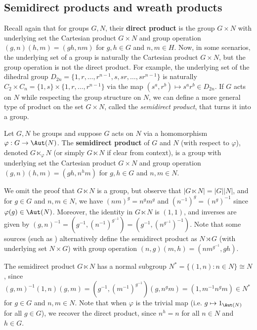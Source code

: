 \subsection{Semidirect products and wreath products}

Recall again that for groups $G,N$, their \textbf{direct product} is the group $G \times N$ with underlying set the Cartesian product $G \times N$ and group operation $(g,n)(h,m) = (gh,nm)$ for $g,h \in G$ and $n,m \in H$. Now, in some scenarios, the underlying set of a group is naturally the Cartesian product $G \times N$, but the group operation is not the direct product. For example, the underlying set of the dihedral group $D_{2n} = \{1,r,\dotsc,r^{n-1},s,sr,\dotsc,sr^{n-1}\}$ is naturally $C_2 \times C_n = \{1,s\} \times \{1,r,\dotsc,r^{n-1}\}$ via the map $(s^a,r^b) \mapsto s^ar^b \in D_{2n}$. If $G$ acts on $N$ while respecting the group structure on $N$, we can define a more general type of product on the set $G \times N$, called the \textit{semidirect product}, that turns it into a group.

\begin{definition}\label{def:semidirect_product}
    Let $G,N$ be groups and suppose $G$ acts on $N$ via a homomorphism $\varphi : G \to \Aut(N)$. The \textbf{semidirect product} of $G$ and $N$ (with respect to $\varphi$), denoted $G \ltimes_\varphi N$ (or simply $G \ltimes N$ if clear from context), is a group with underlying set the Cartesian product $G \times N$ and group operation $(g,n)(h,m) = (gh,n^hm)$ for $g,h \in G$ and $n,m \in N$.
\end{definition}

We omit the proof that $G \ltimes N$ is a group, but observe that $|G \ltimes N| = |G||N|$, and for $g \in G$ and $n,m \in N$, we have $(nm)^g = n^g m^g$ and $(n^{-1})^g = (n^g)^{-1}$ since $\varphi(g) \in \Aut(N)$. Moreover, the identity in $G \ltimes N$ is $(1,1)$, and inverses are given by $(g,n)^{-1} = (g^{-1},(n^{-1})^{g^{-1}}) = (g^{-1},(n^{g^{-1}})^{-1})$. Note that some sources (such as \cite{dixon_mortimer_perm_groups1996}) alternatively define the semidirect product as $N \rtimes G$ (with underlying set $N \times G$) with group operation $(n,g)(m,h) = (nm^{g^{-1}},gh)$.

The semidirect product $G \ltimes N$ has  a normal subgroup $N^* = \{(1,n) : n \in N\} \cong N$, since $(g,m)^{-1}(1,n)(g,m) = (g^{-1},(m^{-1})^{g^{-1}})(g,n^gm) = (1,m^{-1}n^gm) \in N^*$ for $g \in G$ and $n,m \in N$. Note that when $\varphi$ is the trivial map (i.e. $g \mapsto 1_{\Aut(N)}$ for all $g \in G$), we recover the direct product, since $n^h = n$ for all $n \in N$ and $h \in G$.

